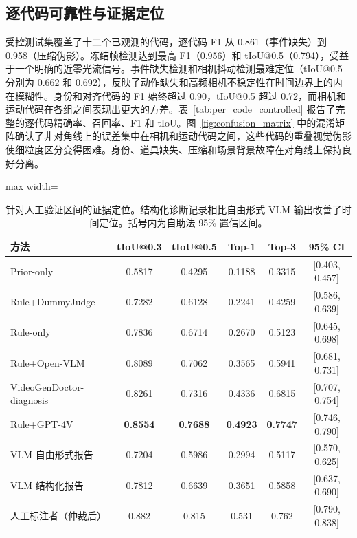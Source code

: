 \documentclass{article}
\newcommand{\HumanLocTIoUfive}{0.815}
\newcommand{\HumanLocTopThree}{0.762}
\begin{document}
\subsection{逐代码可靠性与证据定位}
\label{sec:per_code}
\label{sec:evidence_results}
受控测试集覆盖了十二个已观测的代码，逐代码 F1 从 0.861（事件缺失）到 0.958（压缩伪影）。冻结帧检测达到最高 F1（0.956）和 tIoU@0.5（0.794），受益于一个明确的近零光流信号。事件缺失检测和相机抖动检测最难定位（tIoU@0.5 分别为 0.662 和 0.692），反映了动作缺失和高频相机不稳定性在时间边界上的内在模糊性。身份和对齐代码的 F1 始终超过 0.90，tIoU@0.5 超过 0.72，而相机和运动代码在各组之间表现出更大的方差。表~\ref{tab:per_code_controlled} 报告了完整的逐代码精确率、召回率、F1 和 tIoU。图~\ref{fig:confusion_matrix} 中的混淆矩阵确认了非对角线上的误差集中在相机和运动代码之间，这些代码的重叠视觉伪影使细粒度区分变得困难。身份、道具缺失、压缩和场景背景故障在对角线上保持良好分离。

\begin{table}[t]
\centering\small
\caption{针对人工验证区间的证据定位。结构化诊断记录相比自由形式 VLM 输出改善了时间定位。括号内为自助法 95\% 置信区间。}
\label{tab:evidence_localization}
\begin{adjustbox}{max width=\textwidth}
\begin{tabular}{lccccc}
\toprule
\textbf{方法} & \textbf{tIoU@0.3} & \textbf{tIoU@0.5} & \textbf{Top-1} & \textbf{Top-3} & \textbf{95\% CI} \\
\midrule
Prior-only & 0.5817 & 0.4295 & 0.1188 & 0.3315 & [0.403, 0.457] \\
Rule+DummyJudge & 0.7282 & 0.6128 & 0.2241 & 0.4259 & [0.586, 0.639] \\
Rule-only & 0.7836 & 0.6714 & 0.2670 & 0.5123 & [0.645, 0.698] \\
Rule+Open-VLM & 0.8089 & 0.7062 & 0.3565 & 0.5941 & [0.681, 0.731] \\
VideoGenDoctor-diagnosis & 0.8261 & 0.7316 & 0.4336 & 0.6815 & [0.707, 0.754] \\
Rule+GPT-4V & \textbf{0.8554} & \textbf{0.7688} & \textbf{0.4923} & \textbf{0.7747} & [0.746, 0.790] \\
VLM 自由形式报告 & 0.7204 & 0.5986 & 0.2994 & 0.5117 & [0.570, 0.625] \\
VLM 结构化报告 & 0.7812 & 0.6639 & 0.3651 & 0.5858 & [0.637, 0.690] \\
\midrule
人工标注者（仲裁后） & 0.882 & \HumanLocTIoUfive & 0.531 & \HumanLocTopThree & [0.790, 0.838] \\
\bottomrule
\end{tabular}
\end{adjustbox}
\end{table}
\end{document}
